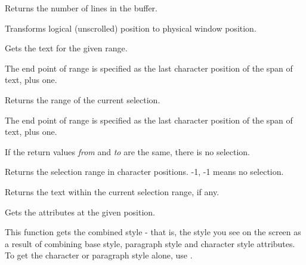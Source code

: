 
Returns the number of lines in the buffer.

\label{wxrichtextctrlgetphysicalpoint}


Transforms logical (unscrolled) position to physical window position.

\label{wxrichtextctrlgetrange}


Gets the text for the given range.

The end point of range is specified as the last character position of the span of text, plus one.

\label{wxrichtextctrlgetselection}


Returns the range of the current selection.

The end point of range is specified as the last character position of the span of text, plus one.

If the return values {\it from} and {\it to} are the same, there is no selection.

\label{wxrichtextctrlgetselectionrange}


Returns the selection range in character positions. -1, -1 means no selection.

\label{wxrichtextctrlgetstringselection}


Returns the text within the current selection range, if any.

\label{wxrichtextctrlgetstyle}


Gets the attributes at the given position.

This function gets the combined style - that is, the style you see on the screen as a result
of combining base style, paragraph style and character style attributes. To get the character
or paragraph style alone, use .

